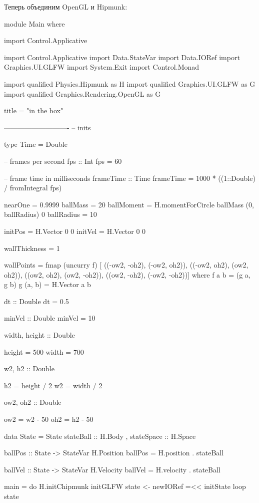 Теперь объединим OpenGL и Hipmunk:


\begin{code}
module Main where

import Control.Applicative

import Control.Applicative
import Data.StateVar
import Data.IORef
import Graphics.UI.GLFW
import System.Exit
import Control.Monad

import qualified Physics.Hipmunk  as H
import qualified Graphics.UI.GLFW as G
import qualified Graphics.Rendering.OpenGL as G
  
title = "in the box"

----------------------------
-- inits

type Time = Double

-- frames per second
fps :: Int
fps = 60

-- frame time in milliseconds
frameTime :: Time
frameTime = 1000 * ((1::Double) / fromIntegral fps)


nearOne = 0.9999
ballMass = 20
ballMoment = H.momentForCircle ballMass (0, ballRadius) 0
ballRadius = 10
    
initPos = H.Vector 0 0
initVel = H.Vector 0 0

wallThickness = 1

wallPoints = fmap (uncurry f) [
    ((-ow2, -oh2), (-ow2, oh2)),
    ((-ow2, oh2),  (ow2, oh2)),
    ((ow2, oh2),  (ow2, -oh2)),
    ((ow2, -oh2),   (-ow2, -oh2))]
    where f a b = (g a, g b) 
          g (a, b) = H.Vector a b  

dt :: Double
dt = 0.5

minVel :: Double
minVel = 10

width, height :: Double

height = 500
width = 700

w2, h2 :: Double

h2 = height / 2
w2 = width / 2

ow2, oh2 :: Double
    
ow2 = w2 - 50 
oh2 = h2 - 50  

data State = State 
    { stateBall     :: H.Body
    , stateSpace    :: H.Space
    }

ballPos :: State -> StateVar H.Position
ballPos = H.position . stateBall

ballVel :: State -> StateVar H.Velocity
ballVel = H.velocity . stateBall


main = do
    H.initChipmunk
    initGLFW
    state <- newIORef =<< initState
    loop state


\end{code}

